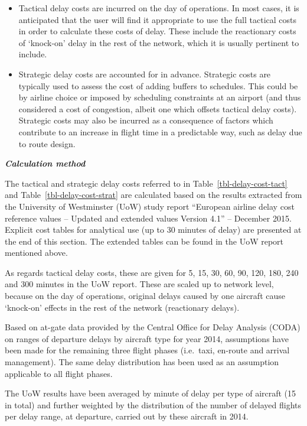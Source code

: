 \documentclass[
  11pt,
  a4paper,
]{book}
\begin{document}
\begin{itemize}
\item
  Tactical delay costs are incurred on the day of operations. In most
  cases, it is anticipated that the user will find it appropriate to use
  the full tactical costs in order to calculate these costs of delay.
  These include the reactionary costs of `knock-on' delay in the rest of
  the network, which it is usually pertinent to include.
\item
  Strategic delay costs are accounted for in advance. Strategic costs
  are typically used to assess the cost of adding buffers to schedules.
  This could be by airline choice or imposed by scheduling constraints
  at an airport (and thus considered a cost of congestion, albeit one
  which offsets tactical delay costs). Strategic costs may also be
  incurred as a consequence of factors which contribute to an increase
  in flight time in a predictable way, such as delay due to route
  design.
\end{itemize}

\textbf{\emph{Calculation method}}

The tactical and strategic delay costs referred to in
Table~\ref{tbl-delay-cost-tact} and Table~\ref{tbl-delay-cost-strat} are
calculated based on the results extracted from the University of
Westminster (UoW) study report ``European airline delay cost reference
values -- Updated and extended values Version 4.1'' -- December 2015.
Explicit cost tables for analytical use (up to 30 minutes of delay) are
presented at the end of this section. The extended tables can be found
in the UoW report mentioned above.

As regards tactical delay costs, these are given for 5, 15, 30, 60, 90,
120, 180, 240 and 300 minutes in the UoW report. These are scaled up to
network level, because on the day of operations, original delays caused
by one aircraft cause `knock-on' effects in the rest of the network
(reactionary delays).

Based on at-gate data provided by the Central Office for Delay Analysis
(CODA) on ranges of departure delays by aircraft type for year 2014,
assumptions have been made for the remaining three flight phases
(i.e.~taxi, en-route and arrival management). The same delay
distribution has been used as an assumption applicable to all flight
phases.

The UoW results have been averaged by minute of delay per type of
aircraft (15 in total) and further weighted by the distribution of the
number of delayed flights per delay range, at departure, carried out by
these aircraft in 2014.
\end{document}
